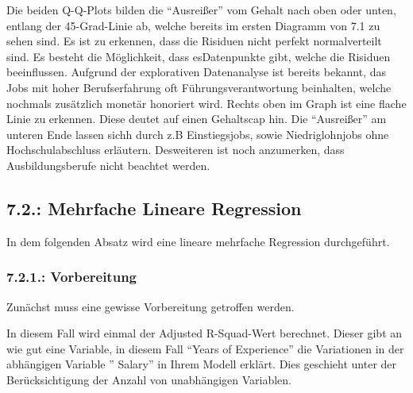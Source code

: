 \documentclass[
  letterpaper,
  DIV=11,
  numbers=noendperiod]{scrartcl}
\newenvironment{Shaded}{\begin{snugshade}}{\end{snugshade}}
\newcommand{\AttributeTok}[1]{\textcolor[rgb]{0.40,0.45,0.13}{#1}}
\newcommand{\FunctionTok}[1]{\textcolor[rgb]{0.28,0.35,0.67}{#1}}
\newcommand{\NormalTok}[1]{\textcolor[rgb]{0.00,0.23,0.31}{#1}}
\newcommand{\OtherTok}[1]{\textcolor[rgb]{0.00,0.23,0.31}{#1}}
\newcommand{\SpecialCharTok}[1]{\textcolor[rgb]{0.37,0.37,0.37}{#1}}
\newcommand{\StringTok}[1]{\textcolor[rgb]{0.13,0.47,0.30}{#1}}
\begin{document}
Die beiden Q-Q-Plots bilden die ``Ausreißer'' vom Gehalt nach oben oder
unten, entlang der 45-Grad-Linie ab, welche bereits im ersten Diagramm
von 7.1 zu sehen sind. Es ist zu erkennen, dass die Risiduen nicht
perfekt normalverteilt sind. Es besteht die Möglichkeit, dass
esDatenpunkte gibt, welche die Risiduen beeinflussen. Aufgrund der
explorativen Datenanalyse ist bereits bekannt, das Jobs mit hoher
Berufserfahrung oft Führungsverantwortung beinhalten, welche nochmals
zusätzlich monetär honoriert wird. Rechts oben im Graph ist eine flache
Linie zu erkennen. Diese deutet auf einen Gehaltscap hin. Die
``Ausreißer'' am unteren Ende lassen sichh durch z.B Einstiegsjobs,
sowie Niedriglohnjobs ohne Hochschulabschluss erläutern. Desweiteren ist
noch anzumerken, dass Ausbildungsberufe nicht beachtet werden.

\hypertarget{mehrfache-lineare-regression}{%
\subsection{7.2.: Mehrfache Lineare
Regression}\label{mehrfache-lineare-regression}}

In dem folgenden Absatz wird eine lineare mehrfache Regression
durchgeführt.

\hypertarget{vorbereitung-1}{%
\subsubsection{7.2.1.: Vorbereitung}\label{vorbereitung-1}}

Zunächst muss eine gewisse Vorbereitung getroffen werden.

In diesem Fall wird einmal der Adjusted R-Squad-Wert berechnet. Dieser
gibt an wie gut eine Variable, in diesem Fall ``Years of Experience''
die Variationen in der abhängigen Variable '' Salary'' in Ihrem Modell
erklärt. Dies geschieht unter der Berücksichtigung der Anzahl von
unabhängigen Variablen.

\begin{Shaded}
\end{Shaded}
\end{document}
